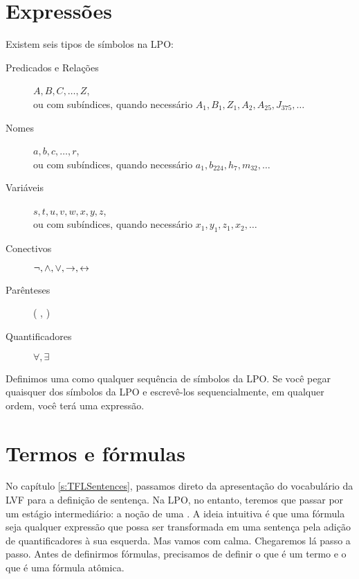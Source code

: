 \section{Expressões}
Existem seis tipos de símbolos na LPO:

\begin{description}
\item[Predicados e Relações] $A,B,C,\ldots,Z$,\\ 
	ou com subíndices, quando necessário $A_1, B_1,Z_1,A_2,A_{25},J_{375},\ldots$
\item[Nomes] $a,b,c,\ldots, r$,\\
	ou com subíndices, quando necessário $a_1, b_{224}, h_7, m_{32},\ldots$
\item[Variáveis] $s, t, u, v, w, x,y,z$,\\
	ou com subíndices, quando necessário $x_1, y_1, z_1, x_2,\ldots$
\item[Conectivos]  $\neg,\wedge,\vee,\rightarrow,\leftrightarrow$
\item[Parênteses] ( , )
\item[Quantificadores]  $\forall, \exists$
\end{description}
Definimos uma  como qualquer sequência de símbolos da LPO.
Se você pegar quaisquer dos símbolos da LPO e escrevê-los sequencialmente, em qualquer ordem, você terá uma expressão.


\section{Termos e fórmulas}
\label{s:TermsFormulas}

No capítulo \ref{s:TFLSentences}, passamos direto da apresentação do vocabulário da LVF para a definição de sentença.
Na LPO, no entanto, teremos que passar por um estágio intermediário: a noção de uma .
A ideia intuitiva é que uma fórmula seja qualquer expressão que possa ser transformada em uma sentença pela adição de quantificadores à sua esquerda.
Mas vamos com calma.
Chegaremos lá passo a passo.
Antes de definirmos fórmulas, precisamos de definir o que é um termo e o que é uma fórmula atômica.


